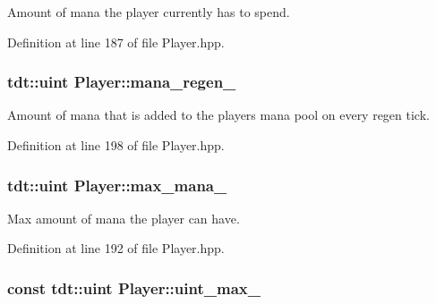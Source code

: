 Amount of mana the player currently has to spend. 



Definition at line 187 of file Player.\+hpp.

\subsubsection[{\texorpdfstring{mana\+\_\+regen\+\_\+}{mana_regen_}}]{\setlength{\rightskip}{0pt plus 5cm}tdt\+::uint Player\+::mana\+\_\+regen\+\_\+\hspace{0.3cm}{\ttfamily [private]}}\hypertarget{class_player_a02e019111b5750e3162ae0e288d3df67}{}\label{class_player_a02e019111b5750e3162ae0e288d3df67}


Amount of mana that is added to the player\textquotesingle{}s mana pool on every regen tick. 



Definition at line 198 of file Player.\+hpp.

\subsubsection[{\texorpdfstring{max\+\_\+mana\+\_\+}{max_mana_}}]{\setlength{\rightskip}{0pt plus 5cm}tdt\+::uint Player\+::max\+\_\+mana\+\_\+\hspace{0.3cm}{\ttfamily [private]}}\hypertarget{class_player_a7b04d40a9b9f4fd3e81e7cbfb4c80086}{}\label{class_player_a7b04d40a9b9f4fd3e81e7cbfb4c80086}


Max amount of mana the player can have. 



Definition at line 192 of file Player.\+hpp.

\subsubsection[{\texorpdfstring{uint\+\_\+max\+\_\+}{uint_max_}}]{\setlength{\rightskip}{0pt plus 5cm}const tdt\+::uint Player\+::uint\+\_\+max\+\_\+\hspace{0.3cm}{\ttfamily [private]}}\hypertarget{class_player_ab9f981851bd34dbb6afcefb97085764f}{}\label{class_player_ab9f981851bd34dbb6afcefb97085764f}


